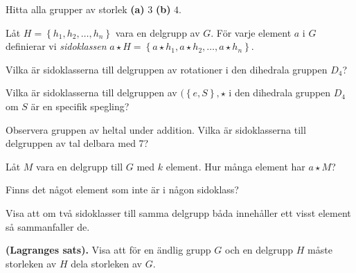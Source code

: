 \documentclass[11pt,fleqn]{book} %
\begin{document}
\begin{problem}
	Hitta alla grupper av storlek \textbf{(a)} \(3\) \textbf{(b)} \(4\).
\end{problem}

\begin{definition} Låt \(H = \left\{h_1, h_2, \dots, h_n\right\}\) vara en delgrupp av \(G\). För varje element \(a\) i \(G\) definierar vi \textit{sidoklassen} \(a \star H = \left\{a  \star h_1, a \star h_2, \dots, a \star h_n\right\}\).
\end{definition}

\begin{problem}
  Vilka är sidoklasserna till delgruppen av rotationer i den dihedrala gruppen \(D_4\)?
\end{problem}

\begin{problem}
  Vilka är sidoklasserna till delgruppen av \((\left\{e, S\right\},  \star \) i den dihedrala gruppen \(D_4\) om \(S\) är en specifik spegling?
\end{problem}

\begin{problem}
  Observera gruppen av heltal under addition. Vilka är sidoklasserna till delgruppen av tal delbara med 7?
\end{problem}

\begin{problem}
  Låt \(M\) vara en delgrupp till \(G\) med \(k\) element. Hur många element har \(a  \star M\)?
\end{problem}

\begin{problem} 
	Finns det något element som inte är i någon sidoklass?
\end{problem}

\begin{problem}
	Visa att om två sidoklasser till samma delgrupp båda innehåller ett visst element så sammanfaller de.
\end{problem}

\begin{problem} \textbf{(Lagranges sats).} 
	Visa att för en ändlig grupp \(G\) och en delgrupp \(H\) måste storleken av \(H\) dela storleken av \(G\).
\end{problem}
\end{document}
